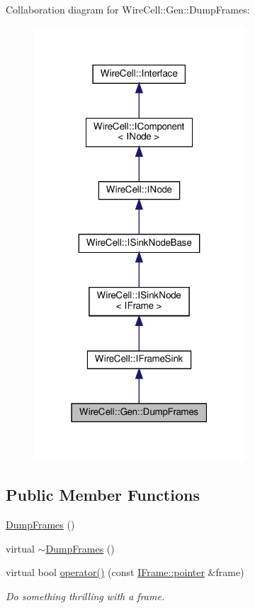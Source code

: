 Collaboration diagram for Wire\+Cell\+:\+:Gen\+:\+:Dump\+Frames\+:
\nopagebreak
\begin{figure}[H]
\begin{center}
\leavevmode
\includegraphics[width=223pt]{class_wire_cell_1_1_gen_1_1_dump_frames__coll__graph}
\end{center}
\end{figure}
\subsection*{Public Member Functions}
\begin{DoxyCompactItemize}
\item 
\hyperlink{class_wire_cell_1_1_gen_1_1_dump_frames_a7afe1d3c3c791e6e0b362b09306dc81c}{Dump\+Frames} ()
\item 
virtual \hyperlink{class_wire_cell_1_1_gen_1_1_dump_frames_abf44003e9162475270c03c2d79f117a1}{$\sim$\+Dump\+Frames} ()
\item 
virtual bool \hyperlink{class_wire_cell_1_1_gen_1_1_dump_frames_acc0a2bf6204f818f0227881d1ca38439}{operator()} (const \hyperlink{class_wire_cell_1_1_i_data_aff870b3ae8333cf9265941eef62498bc}{I\+Frame\+::pointer} \&frame)
\begin{DoxyCompactList}\small\item\em Do something thrilling with a frame. \end{DoxyCompactList}\end{DoxyCompactItemize}

